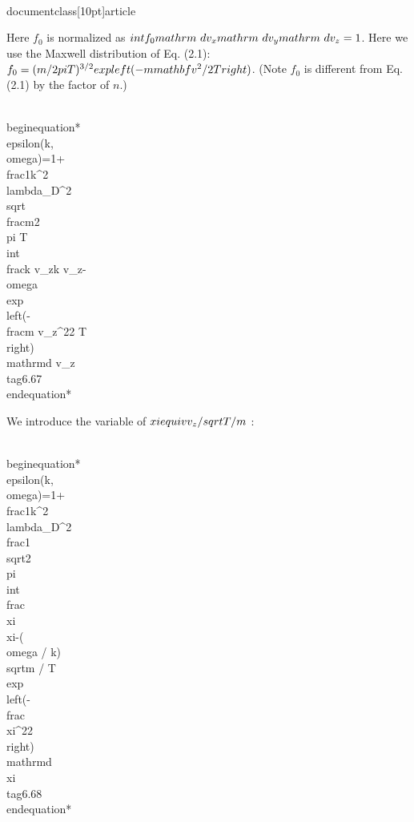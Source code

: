 \\documentclass[10pt]{article}
\begin{document}
{{{{Here $f_{0}$ is normalized as $\\int f_{0} \\mathrm{~d} v_{x} \\mathrm{~d} v_{y} \\mathrm{~d} v_{z}=1$. Here we use the Maxwell distribution of Eq. (2.1): $f_{0}=(m / 2 \\pi T)^{3 / 2} \\exp \\left(-m \\mathbf{v}^{2} / 2 T\\right)$. (Note $f_{0}$ is different from Eq. (2.1) by the factor of $n$.)


\\begin{equation*}
\\epsilon(k, \\omega)=1+\\frac{1}{k^{2} \\lambda_{D}^{2}} \\sqrt{\\frac{m}{2 \\pi T}} \\int \\frac{k v_{z}}{k v_{z}-\\omega} \\exp \\left(-\\frac{m v_{z}^{2}}{2 T}\\right) \\mathrm{d} v_{z} \\tag{6.67}
\\end{equation*}


We introduce the variable of $\\xi \\equiv v_{z} / \\sqrt{T / m}$ :


\\begin{equation*}
\\epsilon(k, \\omega)=1+\\frac{1}{k^{2} \\lambda_{D}^{2}} \\frac{1}{\\sqrt{2 \\pi}} \\int \\frac{\\xi}{\\xi-(\\omega / k) \\sqrt{m / T}} \\exp \\left(-\\frac{\\xi^{2}}{2}\\right) \\mathrm{d} \\xi \\tag{6.68}
\\end{equation*}


}}}}
\end{document}
